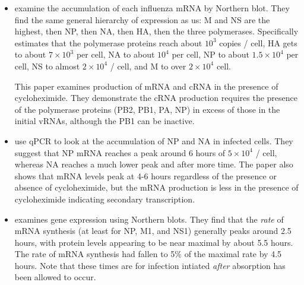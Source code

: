 \documentclass[9pt,lineno]{elife}
\begin{document}
\begin{itemize}

\item \citet{hatada1989control} examine the accumulation of each influenza mRNA by Northern blot.
They find the same general hierarchy of expression as us: M and NS are the highest, then NP, then NA, then HA, then the three polymerases.
Specifically estimates that the polymerase proteins reach about $10^3$ copies / cell, HA gets to about $7 \times 10^3$ per cell, NA to about $10^4$ per cell, NP to about $1.5 \times 10^4$ per cell, NS to almost $2 \times 10^4$ / cell, and M to over $2 \times 10^4$ cell.

\citet{vreede2004model} This paper examines production of mRNA and cRNA in the presence of cycloheximide.
They demonstrate the cRNA production requires the presence of the polymerase proteins (PB2, PB1, PA, NP) in excess of those in the initial vRNAs, although the PB1 can be inactive. 

\item \citet{kawakami2011strand} use qPCR to look at the accumulation of NP and NA in infected cells.
They suggest that NP mRNA reaches a peak around 6 hours of $5 \times 10^4$ / cell, whereas NA reaches a much lower peak and after more time.
The paper also shows that mRNA levels peak at 4-6 hours regardless of the presence or absence of cycloheximide, but the mRNA production is less in the presence of cycloheximide indicating secondary transcription.

\item \citet{shapiro1987influenza} examines gene expression using Northern blots.
They find that the \emph{rate} of mRNA synthesis (at least for NP, M1, and NS1) generally peaks around 2.5 hours, with protein levels appearing to be near maximal by about 5.5 hours.
The rate of mRNA synthesis had fallen to 5\% of the maximal rate by 4.5 hours. 
Note that these times are for infection intiated \emph{after} absorption has been allowed to occur.

\end{itemize}



\nocite{*} %

\end{document}
